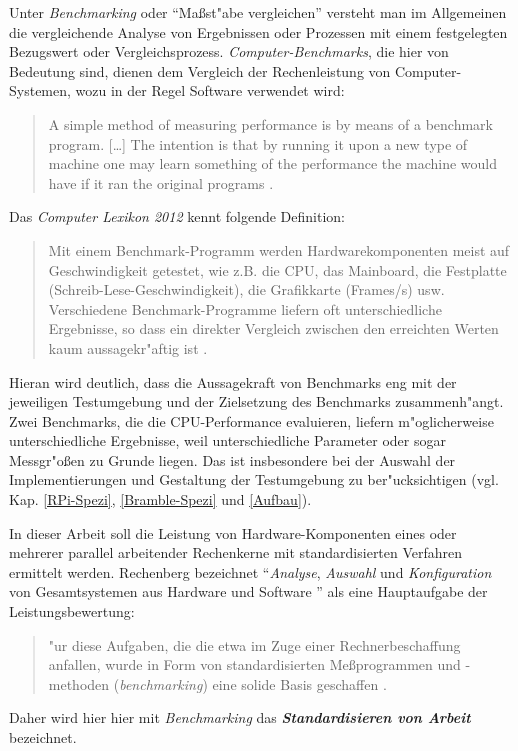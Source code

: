 Unter \textit{Benchmarking} oder "`Ma\ss st"abe vergleichen"' versteht man im Allgemeinen die vergleichende Analyse von Ergebnissen oder Prozessen mit einem festgelegten Bezugswert oder Vergleichsprozess. \textit{Computer-Benchmarks}, die hier von Bedeutung sind, dienen dem Vergleich der Rechenleistung von Computer-Systemen, wozu in der Regel Software verwendet wird:
\begin{quote}
\onehalfspacing
A simple method of measuring performance is by means of a benchmark program. [\dots] The intention is that by running it upon a new type of machine one may learn something of the performance the machine would have if it ran the original programs \cite{cur76}.
\end{quote}
Das \textit{Computer Lexikon 2012} kennt folgende Definition: 
\begin{quote}
\onehalfspacing
Mit einem Benchmark-Programm werden Hardwarekomponenten meist auf Geschwindigkeit getestet, wie z.B. die CPU, das Mainboard, die Festplatte (Schreib-Lese-Geschwindigkeit), die Grafikkarte (Frames/s) usw. Verschiedene Benchmark-Programme liefern oft unterschiedliche Ergebnisse, so dass ein direkter Vergleich zwischen den erreichten Werten kaum aussagekr"aftig ist \cite{pre11}. 
\end{quote}
Hieran wird deutlich, dass die Aussagekraft von Benchmarks eng mit der jeweiligen Testumgebung und der Zielsetzung des Benchmarks zusammenh"angt. Zwei Benchmarks, die die CPU-Performance evaluieren, liefern m"oglicherweise unterschiedliche Ergebnisse, weil unterschiedliche Parameter oder sogar Messgr"o\ss en zu Grunde liegen. Das ist insbesondere bei der Auswahl der Implementierungen und Gestaltung der Testumgebung zu ber"ucksichtigen (vgl. Kap. \ref{RPi-Spezi}, \ref{Bramble-Spezi} und \ref{Aufbau}). 

In dieser Arbeit soll die Leistung von Hardware-Komponenten eines oder mehrerer parallel arbeitender Rechenkerne mit standardisierten Verfahren ermittelt werden. Rechenberg bezeichnet "`\textit{Analyse}, \textit{Auswahl} und \textit{Konfiguration} von Gesamtsystemen aus Hardware und Software \cite{rec06}"' als eine Hauptaufgabe der Leistungsbewertung: 
\begin{quote}
\onehalfspacing
[F]"ur diese Aufgaben, die die etwa im Zuge einer Rechnerbeschaffung anfallen, wurde in Form von standardisierten Me\ss programmen und -methoden (\textit{benchmarking}) eine solide Basis geschaffen \cite{rec06}. 
\end{quote} 
Daher wird hier hier mit \textit{Benchmarking} das \textbf{\textit{Standardisieren von Arbeit}} bezeichnet.

